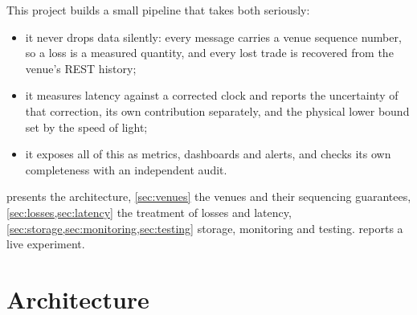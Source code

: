 \documentclass[11pt,a4paper]{article}
\begin{document}
This project builds a small pipeline that takes both seriously:
\begin{itemize}[nosep]
  \item it never drops data silently: every message carries a venue sequence number, so a loss is a measured
        quantity, and every lost trade is recovered from the venue's REST history;
  \item it measures latency against a corrected clock and reports the uncertainty of that correction, its own
        contribution separately, and the physical lower bound set by the speed of light;
  \item it exposes all of this as metrics, dashboards and alerts, and checks its own completeness with an
        independent audit.
\end{itemize}
 presents the architecture, \cref{sec:venues} the venues and their sequencing guarantees,
\cref{sec:losses,sec:latency} the treatment of losses and latency, \cref{sec:storage,sec:monitoring,sec:testing}
storage, monitoring and testing.  reports a live experiment.

\section{Architecture}\label{sec:architecture}
\end{document}

